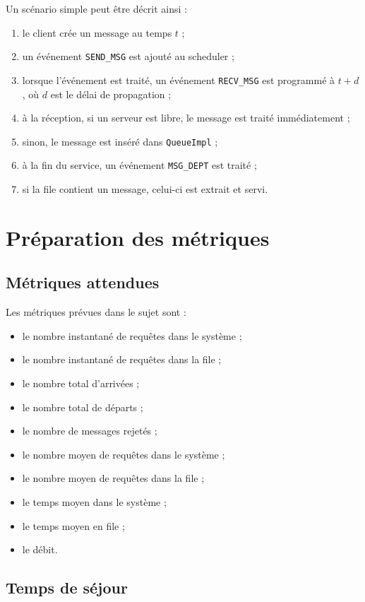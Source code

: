 \documentclass{article}
\begin{document}
Un scénario simple peut être décrit ainsi :
\begin{enumerate}[leftmargin=*]
    \item le client crée un message au temps \(t\) ;
    \item un événement \texttt{SEND\_MSG} est ajouté au scheduler ;
    \item lorsque l’événement est traité, un événement \texttt{RECV\_MSG} est programmé à \(t + d\), où \(d\) est le délai de propagation ;
    \item à la réception, si un serveur est libre, le message est traité immédiatement ;
    \item sinon, le message est inséré dans \texttt{QueueImpl} ;
    \item à la fin du service, un événement \texttt{MSG\_DEPT} est traité ;
    \item si la file contient un message, celui-ci est extrait et servi.
\end{enumerate}

\section{Préparation des métriques}

\subsection{Métriques attendues}

Les métriques prévues dans le sujet sont :
\begin{itemize}[leftmargin=*]
    \item le nombre instantané de requêtes dans le système ;
    \item le nombre instantané de requêtes dans la file ;
    \item le nombre total d’arrivées ;
    \item le nombre total de départs ;
    \item le nombre de messages rejetés ;
    \item le nombre moyen de requêtes dans le système ;
    \item le nombre moyen de requêtes dans la file ;
    \item le temps moyen dans le système ;
    \item le temps moyen en file ;
    \item le débit.
\end{itemize}

\subsection{Temps de séjour}
\end{document}
